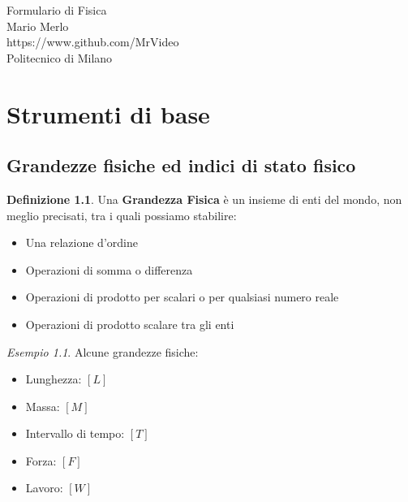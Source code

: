 \documentclass[a4paper, 12pt]{report}
\theoremstyle{definition}
\newtheorem{definition}{Definizione}[section]
\theoremstyle{remark}
\newtheorem*{example}{Esempio}
\theoremstyle{plain}
\begin{document}
\begin{titlepage}
    \begin{center}
        \vspace*{5cm}
        \Huge{Formulario di Fisica}\\[1cm]
        \Large{Mario Merlo}\\
        \Large{https://www.github.com/MrVideo}\\
        \Large{Politecnico di Milano}\\[7,5cm]
    \end{center}
    \doclicenseThis
\end{titlepage}

\tableofcontents

\chapter{Strumenti di base}

\section{Grandezze fisiche ed indici di stato fisico}

\begin{definition}
    Una {\bf Grandezza Fisica} è un insieme di enti del mondo, non meglio precisati, tra i quali possiamo stabilire:
    \begin{itemize}
        \item Una relazione d'ordine
        \item Operazioni di somma o differenza
        \item Operazioni di prodotto per scalari o per qualsiasi numero reale
        \item Operazioni di prodotto scalare tra gli enti
    \end{itemize}
\end{definition}

\begin{example}
    Alcune grandezze fisiche:
    \begin{itemize}
        \item Lunghezza: $[L]$
        \item Massa: $[M]$
        \item Intervallo di tempo: $[T]$
        \item Forza: $[F]$
        \item Lavoro: $[W]$
    \end{itemize}
\end{example}
\end{document}
